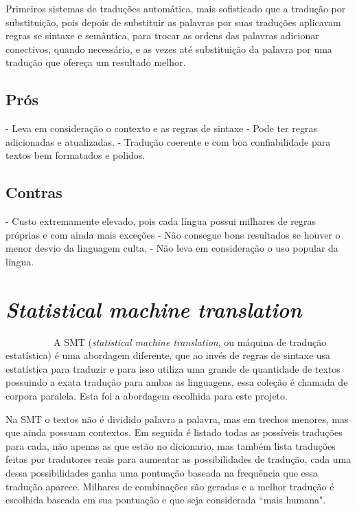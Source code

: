 \documentclass[12pt]{article}
\begin{document}
Primeiros sistemas de traduções automática, mais sofisticado que a tradução por substituição, pois depois de substituir as palavras por suas traduções aplicavam regras se sintaxe e semântica, para trocar as ordens das palavras adicionar conectivos, quando necessário, e as vezes até substituição da palavra por uma tradução que ofereça um resultado melhor.

\subsection{Prós}

- Leva em consideração o contexto e as regras de sintaxe\newline
- Pode ter regras adicionadas e atualizadas.\newline
- Tradução coerente e com boa confiabilidade para textos bem formatados e polidos.

\subsection{Contras}

- Custo extremamente elevado, pois cada língua possui milhares de regras próprias e com ainda mais exceções\newline
- Não consegue bons resultados se houver o menor desvio da linguagem culta.\newline
- Não leva em consideração o uso popular da língua.

\section{\textit{Statistical machine translation}}

~~~~~~~~~~A SMT (\textit{statistical machine translation}, ou máquina de tradução estatística) é uma abordagem diferente, que ao invés de regras de sintaxe usa estatística para traduzir e para isso utiliza uma grande de quantidade de textos possuindo a exata tradução para ambas as linguagens, essa coleção é chamada de corpora paralela. Esta foi a abordagem escolhida para este projeto.

Na SMT o textos não é dividido palavra a palavra, mas em trechos menores, mas que ainda possuam contextos. Em seguida é listado todas as possíveis traduções para cada, não apenas as que estão no dicionario, mas também lista traduções feitas por tradutores reais para aumentar as possibilidades de tradução, cada uma dessa possibilidades ganha uma pontuação baseada na frequência que essa tradução aparece. Milhares de combinações são geradas e a melhor tradução é escolhida baseada em sua pontuação e que seja considerada ``mais humana".
\end{document}
